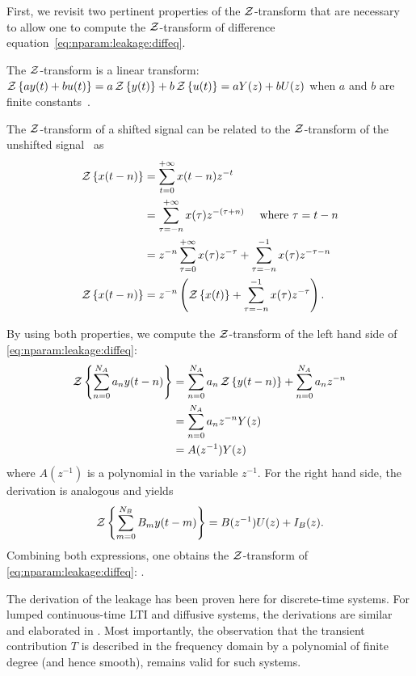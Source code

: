 First, we revisit two pertinent properties of the $\operatorname{\mathcal{Z}}$-transform that are necessary to allow one to compute the $\operatorname{\mathcal{Z}}$-transform of difference equation~\eqref{eq:nparam:leakage:diffeq}.
\begin{property}
The $\operatorname{\mathcal{Z}}$-transform is a linear transform: $\operatorname{\mathcal{Z}} \left\{ ay(t) + bu(t) \right\} = a \operatorname{\mathcal{Z}} \left\{ y(t) \right\} + b \operatorname{\mathcal{Z}} \left\{ u(t) \right\}= aY(z) + bU(z)$ when $a$ and $b$ are finite constants~\citep[Section 10.5.1]{Oppenheim1996}.
\end{property}
\begin{property}
The $\operatorname{\mathcal{Z}}$-transform of a shifted signal can be related to the $\operatorname{\mathcal{Z}}$-transform of the unshifted signal~\citep[Section 10.5.2]{Oppenheim1996} as
\begin{align}
  \operatorname{\mathcal{Z}} \left\{ x(t-n) \right\} 
  &= \sum_{t=0}^{+\infty} x(t-n) z^{-t} \\
  &= \sum_{\tau = -n}^{+\infty} x(\tau) z^{-(\tau + n)} \quad \text{ where } \tau = t - n\\
  &= z^{-n} \sum_{\tau = 0}^{+\infty} x(\tau) z^{-\tau} +  \sum_{\tau = -n}^{-1} x(\tau) z^{-\tau-n}\\
  \operatorname{\mathcal{Z}} \left\{ x(t-n) \right\} &= z^{-n} \left( \operatorname{\mathcal{Z}} \left\{ x(t) \right\} + \sum_{\tau = -n}^{-1} x(\tau) z^{-\tau} \right)
  \text{.}
\end{align}
\end{property}

By using both properties, we compute the $\operatorname{\mathcal{Z}}$-transform of the left hand side of \eqref{eq:nparam:leakage:diffeq}:
\begin{align}
  \operatorname{\mathcal{Z}} \left\{ \sum_{n=0}^{N_{A}} a_n y(t-n) \right\}
  &=
  \sum_{n=0}^{N_{A}} a_n \operatorname{\mathcal{Z}} \left\{ y(t-n) \right\}
  +\sum_{n=0}^{N_{A}} a_n z^{-n} \\
  &=
  \sum_{n=0}^{N_{A}} a_n  z^{-n} Y(z)\\
  &=
  A(z^{-1}) Y(z)
\end{align}
where $A(z^{-1})$ is a polynomial in the variable $z^{-1}$.
For the right hand side, the derivation is analogous and yields
\begin{equation}
  \operatorname{\mathcal{Z}} \left\{ \sum_{m=0}^{N_{B}} B_m y(t-m) \right\} =
  B(z^{-1}) U(z) + I_{B}(z)
  \text{.}
\end{equation}
Combining both expressions, one obtains the $\operatorname{\mathcal{Z}}$-transform of \eqref{eq:nparam:leakage:diffeq}:
.




\begin{remark}
The derivation of the leakage has been proven here for discrete-time systems.
For lumped continuous-time \gls{LTI} and diffusive systems, the derivations are similar and elaborated in \citet[Appendix 6.B]{Pintelon2012}.
Most importantly, the observation that the transient contribution $T$ is described in the frequency domain by a polynomial of finite degree (and hence smooth), remains valid for such systems.
\end{remark}

